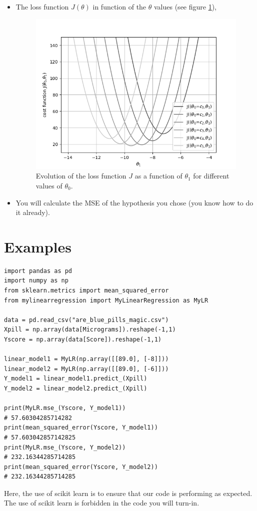 \documentclass{42-en}
\begin{document}
\begin{itemize}
  \item The loss function $J(\theta)$ in function of the $\theta$ values (see figure \ref{loss function qs function of theta1 and theta0}),
  \begin{figure}[!h]
    \centering
    \includegraphics[scale=0.6]{assets/ex04_J_vs_t1.png}
    \caption{Evolution of the loss function $J$ as a function of $\theta_1$ for different values of $\theta_0$.}
    \label{loss function qs function of theta1 and theta0}
  \end{figure}
   
  \item You will calculate the MSE of the hypothesis you chose (you know how to do it already).
\end{itemize}

\section*{Examples}
\begin{verbatim}
import pandas as pd
import numpy as np
from sklearn.metrics import mean_squared_error
from mylinearregression import MyLinearRegression as MyLR

data = pd.read_csv("are_blue_pills_magic.csv")
Xpill = np.array(data[Micrograms]).reshape(-1,1)
Yscore = np.array(data[Score]).reshape(-1,1)

linear_model1 = MyLR(np.array([[89.0], [-8]]))
linear_model2 = MyLR(np.array([[89.0], [-6]]))
Y_model1 = linear_model1.predict_(Xpill)
Y_model2 = linear_model2.predict_(Xpill)

print(MyLR.mse_(Yscore, Y_model1))
# 57.60304285714282
print(mean_squared_error(Yscore, Y_model1))
# 57.603042857142825
print(MyLR.mse_(Yscore, Y_model2))
# 232.16344285714285
print(mean_squared_error(Yscore, Y_model2))
# 232.16344285714285
\end{verbatim}
\par
Here, the use of scikit learn is to ensure that our code is performing as expected. The use of scikit learn is forbidden in the code you will turn-in.
\end{document}
